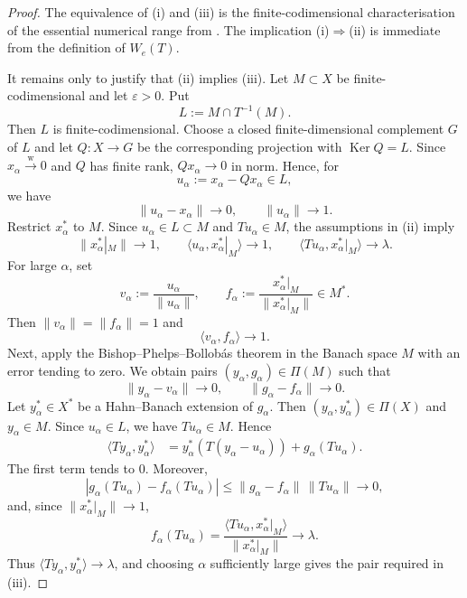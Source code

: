 \documentclass[11pt]{amsart}
\numberwithin{equation}{section}
\theoremstyle{definition}
\theoremstyle{remark}
\DeclareMathOperator{\Ker}{Ker}
\newcommand{\ip}[2]{\langle #1,#2\rangle}
\newcommand{\We}{W_e}
\newcommand{\wto}{\xrightarrow{\mathrm w}}
\begin{document}
\begin{proof}
The equivalence of \textup{(i)} and \textup{(iii)} is the finite-codimensional characterisation of the essential numerical range from \cite[Proposition~6]{BM}.  The implication \textup{(i)$\Rightarrow$(ii)} is immediate from the definition of $\We(T)$.

It remains only to justify that \textup{(ii)} implies \textup{(iii)}.  Let $M\subset X$ be finite-codimensional and let $\varepsilon>0$.  Put
\[
        L:=M\cap T^{-1}(M) .
\]
Then $L$ is finite-codimensional.  Choose a closed finite-dimensional complement $G$ of $L$ and let $Q:X\to G$ be the corresponding projection with $\Ker Q=L$.  Since $x_\alpha\wto0$ and $Q$ has finite rank, $Qx_\alpha\to0$ in norm.  Hence, for
\[
        u_\alpha:=x_\alpha-Qx_\alpha\in L,
\]
we have
\[
        \|u_\alpha-x_\alpha\|\to0,
        \qquad
        \|u_\alpha\|\to1 .
\]
Restrict $x_\alpha^*$ to $M$.  Since $u_\alpha\in L\subset M$ and $Tu_\alpha\in M$, the assumptions in \textup{(ii)} imply
\[
        \|x_\alpha^*|_M\|\to1,
        \qquad
        \ip{u_\alpha}{x_\alpha^*|_M}\to1,
        \qquad
        \ip{Tu_\alpha}{x_\alpha^*|_M}\to\lambda .
\]
For large $\alpha$, set
\[
        v_\alpha:=\frac{u_\alpha}{\|u_\alpha\|},
        \qquad
        f_\alpha:=\frac{x_\alpha^*|_M}{\|x_\alpha^*|_M\|}\in M^* .
\]
Then $\|v_\alpha\|=\|f_\alpha\|=1$ and
\[
        \ip{v_\alpha}{f_\alpha}\to1 .
\]
Next, apply the Bishop--Phelps--Bollob\'as theorem in the Banach space $M$ with an error tending to zero.  We obtain pairs $(y_\alpha,g_\alpha)\in\Pi(M)$ such that
\[
        \|y_\alpha-v_\alpha\|\to0,
        \qquad
        \|g_\alpha-f_\alpha\|\to0 .
\]
Let $y_\alpha^*\in X^*$ be a Hahn--Banach extension of $g_\alpha$.  Then $(y_\alpha,y_\alpha^*)\in\Pi(X)$ and $y_\alpha\in M$.  Since $u_\alpha\in L$, we have $Tu_\alpha\in M$. Hence
\[
\begin{aligned}
        \ip{Ty_\alpha}{y_\alpha^*}
        &=y_\alpha^*(T(y_\alpha-u_\alpha))+g_\alpha(Tu_\alpha).
\end{aligned}
\]
The first term tends to $0$.  Moreover,
\[
        |g_\alpha(Tu_\alpha)-f_\alpha(Tu_\alpha)|
        \le \|g_\alpha-f_\alpha\|\,\|Tu_\alpha\|\to0,
\]
and, since $\|x_\alpha^*|_M\|\to1$,
\[
        f_\alpha(Tu_\alpha)
        =
        \frac{\ip{Tu_\alpha}{x_\alpha^*|_M}}{\|x_\alpha^*|_M\|}
        \to\lambda .
\]
Thus $\ip{Ty_\alpha}{y_\alpha^*}\to\lambda$, and choosing $\alpha$ sufficiently large gives the pair required in \textup{(iii)}.
\end{proof}
\end{document}
